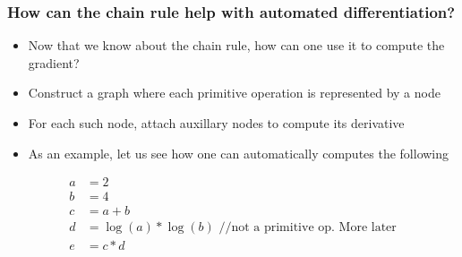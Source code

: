 \documentclass{beamer}
\theoremstyle{plain} %
\theoremstyle{example} %
\begin{document}
\begin{frame}
    \frametitle{How can the chain rule help with automated differentiation?}
    \begin{itemize}
        \item  Now that we know about the chain rule, how can one use it to compute the gradient?
        \item Construct a graph where each primitive operation is represented by a node
        \item For each such node, attach auxillary nodes to compute its derivative
        \item As an example, let us see how one can automatically computes the following
    \end{itemize}
   
\begin{align*}
    a&=2\\
    b&=4\\
    c&=a+b\\
    d&=\log(a)*\log(b) \text{  //not a primitive op. More later}\\
    e&=c*d
\end{align*}    

\end{frame}
\end{document}
